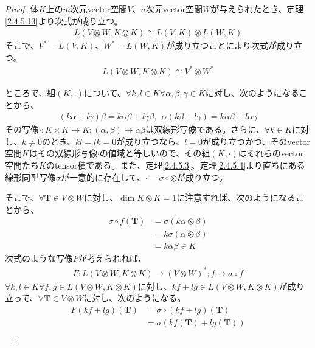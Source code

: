 \documentclass[dvipdfmx]{jsarticle}
\begin{document}
\begin{proof}
体$K$上の$m$次元vector空間$V$、$n$次元vector空間$W$が与えられたとき、定理\ref{2.4.5.13}より次式が成り立つ。
\begin{align*}
L(V \otimes W,K \otimes K) \cong L(V,K) \otimes L(W,K)
\end{align*}
そこで、$V^{*} = L(V,K)$、$W^{*} = L(W,K)$が成り立つことにより次式が成り立つ。
\begin{align*}
L(V \otimes W,K \otimes K) \cong V^{*} \otimes W^{*}
\end{align*}\par
ところで、組$(K, \cdot )$について、$\forall k,l \in K\forall\alpha,\beta,\gamma \in K$に対し、次のようになることから、
\begin{align*}
(k\alpha + l\gamma)\beta = k\alpha\beta + l\gamma\beta,\ \ \alpha(k\beta + l\gamma) = k\alpha\beta + l\alpha\gamma
\end{align*}
その写像$\cdot :K \times K \rightarrow K;(\alpha,\beta) \mapsto \alpha\beta$は双線形写像である。さらに、$\forall k \in K$に対し、$k \neq 0$のとき、$kl = lk = 0$が成り立つなら、$l = 0$が成り立つかつ、そのvector空間$K$はその双線形写像$\cdot$の値域と等しいので、その組$(K, \cdot )$はそれらのvector空間たち$K$のtensor積である。また、定理\ref{2.4.5.3}、定理\ref{2.4.5.4}より直ちにある線形同型写像$\sigma$が一意的に存在して、$\cdot = \sigma \circ \otimes$が成り立つ。\par
そこで、$\forall\mathbf{T} \in V \otimes W$に対し、$\dim{K \otimes K} = 1$に注意すれば、次のようになることから、
\begin{align*}
\sigma \circ f\left( \mathbf{T} \right) &= \sigma(k\alpha \otimes \beta)\\
&= k\sigma(\alpha \otimes \beta)\\
&= k\alpha\beta \in K
\end{align*}
次式のような写像$F$が考えられれば、
\begin{align*}
F:L(V \otimes W,K \otimes K) \rightarrow (V \otimes W)^{*};f \mapsto \sigma \circ f
\end{align*}
$\forall k,l \in K\forall f,g \in L(V \otimes W,K \otimes K)$に対し、$kf + lg \in L(V \otimes W,K \otimes K)$が成り立って、$\forall\mathbf{T} \in V \otimes W$に対し、次のようになる。
\begin{align*}
F(kf + lg)\left( \mathbf{T} \right) &= \sigma \circ (kf + lg)\left( \mathbf{T} \right)\\
&= \sigma\left( kf\left( \mathbf{T} \right) + lg\left( \mathbf{T} \right) \right)\\

\end{align*}
\end{proof}
\end{document}
